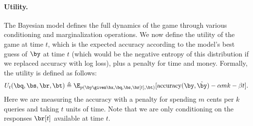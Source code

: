 \paragraph{Utility.}

The Bayesian model defines the full dynamics of the game through various
conditioning and marginalization operations.
We now define the utility of the game at time $t$, which is the expected
accuracy according to the model's best guess of $\by$ at time $t$
(which would be the negative entropy of this distribution if we replaced
accuracy with log loss), plus a penalty for time and money.
Formally, the utility is defined as follows:
\begin{align}
  U_t(\bq, \bs, \br, \bt) \eqdef \E_{p(\by \given \bx, \bq, \bs, \br[t], \bt)}[\accuracy(\by, \byt) - \alpha m k - \beta t].
\end{align}
Here we are measuring the accuracy with a penalty for spending $m$ cents per $k$ queries
and taking $t$ units of time.
Note that we are only conditioning on the responses $\br[t]$ available at time $t$.





